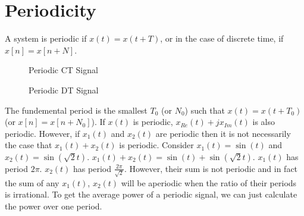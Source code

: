 \section{Periodicity}

A system is periodic if $x(t) = x(t + T)$, or 
in the case of discrete time, if $x[n] = x[n + N]$. 


\begin{figure}
    \centering
    \caption{Periodic CT Signal}
\end{figure}
    
\begin{figure}
    \centering
    \caption{Periodic DT Signal}
\end{figure}

The fundemental period is the smallest $T_0$ (or $N_0$) such 
that $x(t) = x(t + T_0)$ (or $x[n] = x[n + N_0]$). If $x(t)$ is periodic, $x_{Re}(t) + j x_{Im}(t)$ is also 
periodic. However, if $x_1(t)$ and $x_2(t)$ are periodic then it is not 
necessarily the case that $x_1(t) + x_2(t)$ is 
periodic. Consider $x_1(t) = \sin(t)$ and 
$x_2(t) = \sin(\sqrt{2} t)$. $x_1(t) + x_2(t) = \sin(t) + \sin(\sqrt{2}t)$.
$x_1(t)$ has period $2\pi$. $x_2(t)$ has period $\frac{2\pi}{\sqrt{2}}$. 
However, their sum is not periodic and in fact the sum of 
any $x_1(t)$, $x_2(t)$ will be aperiodic when the ratio 
of their periods is irrational. 
To get the average power of a periodic signal, 
we can just calculate the power over one period. 

